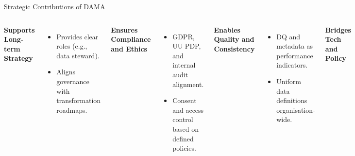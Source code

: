 \documentclass[aspectratio=169, table]{beamer}
\begin{document}
	\begin{frame}[fragile]{Strategic Contributions of DAMA}
		\vspace{20pt}
		\begin{columns}
			\textbf{Supports Long-term Strategy}
			\begin{itemize}
				\item Provides clear roles (e.g., data steward).
				\item Aligns governance with transformation roadmaps.
			\end{itemize}
			
			\textbf{Ensures Compliance and Ethics}
			\begin{itemize}
				\item GDPR, UU PDP, and internal audit alignment.
				\item Consent and access control based on defined policies.
			\end{itemize}
			
			\textbf{Enables Quality and Consistency}
			\begin{itemize}
				\item DQ and metadata as performance indicators.
				\item Uniform data definitions organisation-wide.
			\end{itemize}
			
			\textbf{Bridges Tech and Policy}
			\begin{itemize}
				\item Co-owned validation rules by engineers and business users.
				\item Collaborative cross-division governance.
			\end{itemize}
		\end{columns}
	\end{frame}
	
\end{document}
